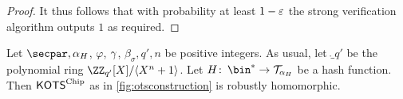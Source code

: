 \begin{proof}
%   
It thus follows that with probability at least $1-\varepsilon$ the strong verification algorithm outputs $1$ as required.
\end{proof}


\begin{lemma}\label{lem:kots_homomorphic}
  Let $\secpar, \alpha_H$, $\varphi$, $\gamma$, $\beta_\sigma,q',n$ be positive integers.
  As usual, let $\ring_{q'}$ be the polynomial ring $\defringqq$.
  Let $H\colon\, \bin^* \to \tern_{\alpha_H}$ be a hash function.
  Then $\mathsf{KOTS}^{\textup{Chip}}$ as in \autoref{fig:otsconstruction} is robustly homomorphic.
\end{lemma}

